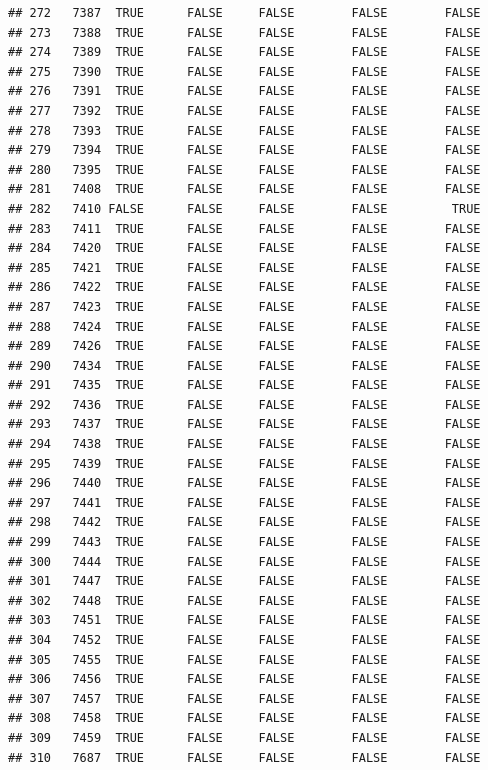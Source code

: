 \documentclass[
  10pt,
  b5paper,
  oneside]{book}
\begin{document}
\begin{verbatim}
## 272   7387  TRUE      FALSE     FALSE        FALSE        FALSE
## 273   7388  TRUE      FALSE     FALSE        FALSE        FALSE
## 274   7389  TRUE      FALSE     FALSE        FALSE        FALSE
## 275   7390  TRUE      FALSE     FALSE        FALSE        FALSE
## 276   7391  TRUE      FALSE     FALSE        FALSE        FALSE
## 277   7392  TRUE      FALSE     FALSE        FALSE        FALSE
## 278   7393  TRUE      FALSE     FALSE        FALSE        FALSE
## 279   7394  TRUE      FALSE     FALSE        FALSE        FALSE
## 280   7395  TRUE      FALSE     FALSE        FALSE        FALSE
## 281   7408  TRUE      FALSE     FALSE        FALSE        FALSE
## 282   7410 FALSE      FALSE     FALSE        FALSE         TRUE
## 283   7411  TRUE      FALSE     FALSE        FALSE        FALSE
## 284   7420  TRUE      FALSE     FALSE        FALSE        FALSE
## 285   7421  TRUE      FALSE     FALSE        FALSE        FALSE
## 286   7422  TRUE      FALSE     FALSE        FALSE        FALSE
## 287   7423  TRUE      FALSE     FALSE        FALSE        FALSE
## 288   7424  TRUE      FALSE     FALSE        FALSE        FALSE
## 289   7426  TRUE      FALSE     FALSE        FALSE        FALSE
## 290   7434  TRUE      FALSE     FALSE        FALSE        FALSE
## 291   7435  TRUE      FALSE     FALSE        FALSE        FALSE
## 292   7436  TRUE      FALSE     FALSE        FALSE        FALSE
## 293   7437  TRUE      FALSE     FALSE        FALSE        FALSE
## 294   7438  TRUE      FALSE     FALSE        FALSE        FALSE
## 295   7439  TRUE      FALSE     FALSE        FALSE        FALSE
## 296   7440  TRUE      FALSE     FALSE        FALSE        FALSE
## 297   7441  TRUE      FALSE     FALSE        FALSE        FALSE
## 298   7442  TRUE      FALSE     FALSE        FALSE        FALSE
## 299   7443  TRUE      FALSE     FALSE        FALSE        FALSE
## 300   7444  TRUE      FALSE     FALSE        FALSE        FALSE
## 301   7447  TRUE      FALSE     FALSE        FALSE        FALSE
## 302   7448  TRUE      FALSE     FALSE        FALSE        FALSE
## 303   7451  TRUE      FALSE     FALSE        FALSE        FALSE
## 304   7452  TRUE      FALSE     FALSE        FALSE        FALSE
## 305   7455  TRUE      FALSE     FALSE        FALSE        FALSE
## 306   7456  TRUE      FALSE     FALSE        FALSE        FALSE
## 307   7457  TRUE      FALSE     FALSE        FALSE        FALSE
## 308   7458  TRUE      FALSE     FALSE        FALSE        FALSE
## 309   7459  TRUE      FALSE     FALSE        FALSE        FALSE
## 310   7687  TRUE      FALSE     FALSE        FALSE        FALSE

\end{verbatim}
\end{document}
